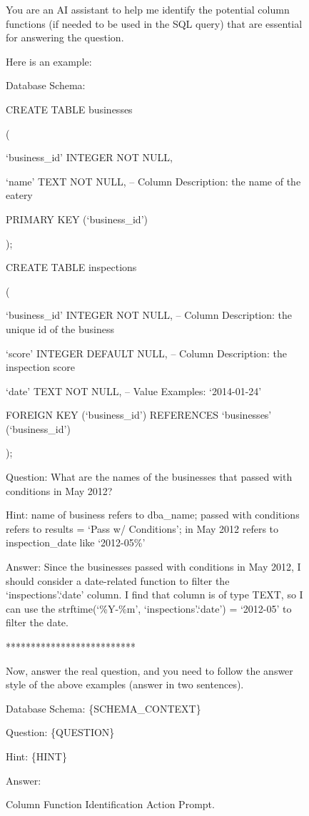 \newpage

\begin{figure}[t!]
    \centering
    \begin{tcolorbox}[
        title=Column Function Identification Action Prompt,
        colback=white,        %
        colframe=blue!75!black,  %
        fonttitle=\bfseries,    %
    ]

You are an AI assistant to help me identify the potential column functions (if needed to be used in the SQL query) that are essential for answering the question.


Here is an example:

Database Schema:

CREATE TABLE businesses

(

    `business\_id' INTEGER NOT NULL,
    
    `name' TEXT NOT NULL, -- Column Description: the name of the eatery
    
    PRIMARY KEY (`business\_id')
    
);

CREATE TABLE inspections

(

    `business\_id' INTEGER NOT NULL, -- Column Description: the unique id of the business
    
    `score' INTEGER DEFAULT NULL, -- Column Description: the inspection score
    
    `date' TEXT NOT NULL, -- Value Examples: `2014-01-24'
    
    FOREIGN KEY (`business\_id') REFERENCES `businesses' (`business\_id')
    
);

Question:
What are the names of the businesses that passed with conditions in May 2012?

Hint:
name of business refers to dba\_name; passed with conditions refers to results = `Pass w/ Conditions'; in May 2012 refers to inspection\_date like `2012-05\%'

Answer:
Since the businesses passed with conditions in May 2012, I should consider a date-related function to filter the `inspections'.`date' column. I find that column is of type TEXT, so I can use the strftime(`\%Y-\%m', `inspections'.`date') = `2012-05' to filter the date.

**************************

Now, answer the real question, and you need to follow the answer style of the above examples (answer in two sentences).

Database Schema:
\{SCHEMA\_CONTEXT\}

Question:
\{QUESTION\}

Hint:
\{HINT\}

Answer:
    
    \end{tcolorbox}
    \caption{Column Function Identification Action Prompt.}
    \label{fig:prompt-column-function-identification}
\end{figure}

